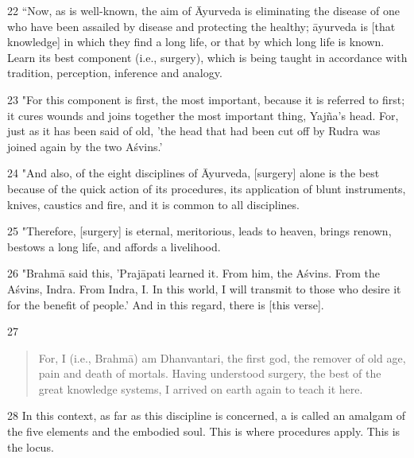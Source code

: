 \documentclass[12pt]{article}
\begin{document}
\begin{translation}
        \item[22] “Now, as is well-known, the aim of Āyurveda is eliminating the 
        disease of one who have been assailed by disease and protecting the healthy;  
        āyurveda is [that knowledge] in which they find a long life, or that by which 
        long life is known. Learn its best component (i.e., surgery), which is being 
        taught in accordance with tradition, perception, inference and analogy.
        
        \item[23] "For this component is first, the most important, because it is 
        referred to first; it cures wounds and joins together the most important thing, 
        Yajña's head. For, just as it has been said of old, 'the head that had been cut off 
        by Rudra was joined again by the two Aśvins.'
        
        \item[24] "And also, of the eight disciplines of Āyurveda, [surgery] alone is 
        the best because of the quick action of its procedures, its application of blunt 
        instruments, knives, caustics and fire, and it is common to all disciplines.
        
        \item[25] "Therefore, [surgery] is eternal, meritorious, leads to heaven, 
        brings renown, bestows a long life, and affords a livelihood.
        
        \item[26] "Brahmā said this, 'Prajāpati learned it. From him, the Aśvins. From 
        the Aśvins, 
        Indra. From Indra, I. In this world, I will transmit to those who desire it for the benefit of 
        people.' And in this regard, there is [this verse].
        
        \item[27]           \begin{quote}
            For, I (i.e., Brahmā) am Dhanvantari, the first god, the remover of old age, 
            pain and 
            death of mortals. Having understood surgery, the best of the great 
            knowledge 
            systems, I arrived on earth again to teach it here.
        \end{quote}    
        
        
        \item[28] In this context, as far as this discipline is concerned, a 
         is called an amalgam of the five elements 
        and the embodied soul.  This is where procedures apply. This is the locus. 
        

\end{translation}
\end{document}
